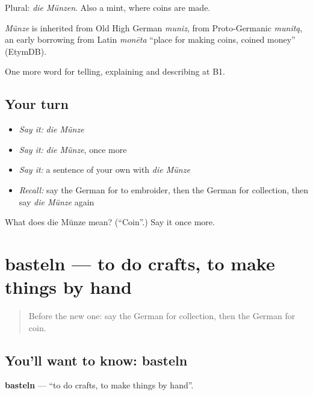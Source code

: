 Plural: \emph{die Münzen}. Also a mint, where coins are made.

\begin{cousinweb}
\emph{Münze} is inherited from Old High German \emph{muniz}, from Proto-Germanic \emph{munitą}, an early borrowing from Latin \emph{monēta} \textquotedblleft{}place for making coins, coined money\textquotedblright{} (EtymDB).
\end{cousinweb}

\begin{grammarlens}[title={What you've built}]
One more word for telling, explaining and describing at B1.
\end{grammarlens}

\subsection*{Your turn}
\begin{itemize}
\raggedright
  \item \emph{Say it:} \emph{die Münze}
  \item \emph{Say it:} \emph{die Münze}, once more
  \item \emph{Say it:} a sentence of your own with \emph{die Münze}
  \item \emph{Recall:} say the German for to embroider, then the German for collection, then say \emph{die Münze} again
\end{itemize}

\begin{tcolorbox}[breakable,colback=teal!4,colframe=teal!35!black,title={Before you move on}]
What does die Münze mean? (\textquotedblleft{}Coin\textquotedblright{}.) Say it once more.
\end{tcolorbox}
\section[basteln]{basteln — to do crafts, to make things by hand}

\label{lesson:GE-C500-basteln}



\begin{quote}
Before the new one: say the German for collection, then the German for coin.
\end{quote}

\subsection*{You'll want to know: basteln}
\textbf{basteln} — \textquotedblleft{}to do crafts, to make things by hand\textquotedblright{}.

